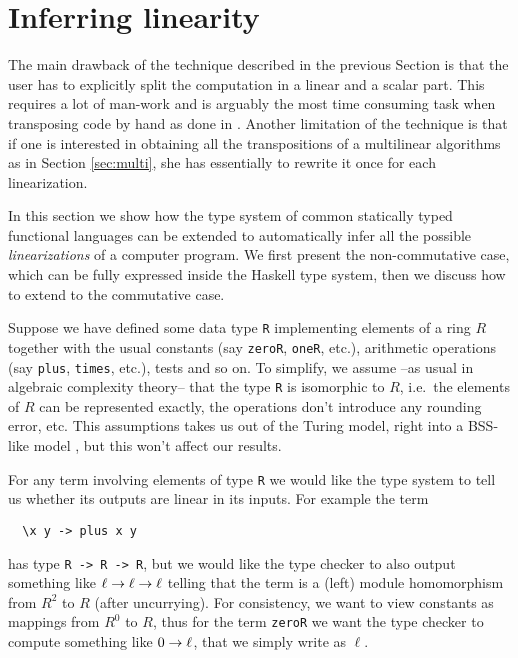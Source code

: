 \section{Inferring linearity}
\label{sec:inference}
\lstset{language=haskell}

The main drawback of the technique described in the previous Section
is that the user has to explicitly split the computation in a linear
and a scalar part. This requires a lot of man-work and is arguably the
most time consuming task when transposing code by hand as done in
\cite{Sho95,BoLeSc03}. Another limitation of the technique is that if
one is interested in obtaining all the transpositions of a multilinear
algorithms as in Section \ref{sec:multi}, she has essentially to
rewrite it once for each linearization.

In this section we show how the type system of common statically typed
functional languages can be extended to automatically infer all the
possible \emph{linearizations} of a computer program. We first present
the non-commutative case, which can be fully expressed inside the
Haskell type system, then we discuss how to extend to the commutative
case.

Suppose we have defined some data type \lstinline{R} implementing
elements of a ring $R$ together with the usual constants (say
\lstinline{zeroR}, \lstinline{oneR}, etc.), arithmetic operations (say
\lstinline{plus}, \lstinline{times}, etc.), tests and so on. To
simplify, we assume --as usual in algebraic complexity theory-- that
the type \lstinline{R} is isomorphic to $R$, i.e.\ the elements of $R$
can be represented exactly, the operations don't introduce any
rounding error, etc. This assumptions takes us out of the Turing
model, right into a BSS-like model \cite{BSS}, but this won't affect
our results.

For any term involving elements of type \lstinline{R} we would like
the type system to tell us whether its outputs are linear in its
inputs. For example the term
\begin{lstlisting}
  \x y -> plus x y
\end{lstlisting}
has type \lstinline{R -> R -> R}, but we would like the type checker
to also output something like $\ell\rightarrow\ell\rightarrow\ell$ telling that the
term is a (left) module homomorphism from $R^2$ to $R$ (after
uncurrying). For consistency, we want to view constants as mappings
from $R^0$ to $R$, thus for the term \lstinline{zeroR} we want the
type checker to compute something like $0\rightarrow\ell$, that we simply
write as $\ell$.

